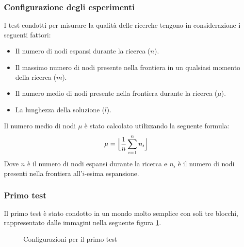 \documentclass{article}
\begin{document}
	\subsubsection{Configurazione degli esperimenti}
	I test condotti per misurare la qualità delle ricerche tengono in considerazione i seguenti fattori:
	\begin{itemize}
		\item Il numero di nodi espansi durante la ricerca ($n$).
		\item Il massimo numero di nodi presente nella frontiera in un qualsiasi momento della ricerca ($m$).
		\item Il numero medio di nodi presente nella frontiera  durante la ricerca ($\mu$).
		\item La lunghezza della soluzione ($l$).
	\end{itemize}
	Il numero medio di nodi $\mu$ è stato calcolato utilizzando la seguente formula:\\
	\[ \mu = \Bigl\lfloor \frac{1}{n}\sum_{i=1}^{n} n_{i} \Bigl\rfloor\]
	Dove $n$ è il numero di nodi espansi durante la ricerca e $n_{i}$ è il numero di nodi presenti nella frontiera all'$i$-esima espansione. 
	
	\subsubsection{Primo test}
	Il primo test è stato condotto in un mondo molto semplice con soli tre blocchi, rappresentato dalle immagini nella seguente figura \ref{fig:exp1}.
	\begin{figure}[H]
		\centering
		\protect\caption{Configurazioni per il primo test}
		\label{fig:exp1}
	\end{figure}
	
\end{document}
